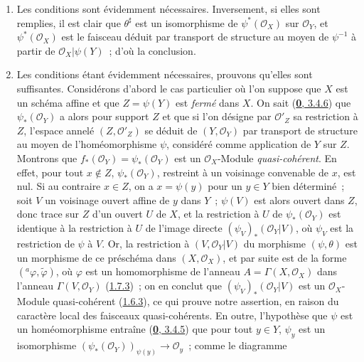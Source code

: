\begin{enumerate}
  \item[\emph{a)}] Les conditions sont évidemment nécessaires. Inversement, si elles
  sont remplies, il est clair que $\theta^\sharp$ est un isomorphisme de
  $\psi^*(\mathscr{O}_X)$ sur $\mathscr{O}_Y$, et
  $\psi^*(\mathscr{O}_X)$ est le faisceau déduit par transport de structure au
  moyen de $\psi^{-1}$ à partir de $\mathscr{O}_X|\psi(Y)$~; d'où la
  conclusion.
  \item[\emph{b)}] Les conditions étant évidemment nécessaires, prouvons qu'elles
  sont suffisantes. Considérons d'abord le cas particulier où l'on suppose que
  $X$ est un schéma affine et que $Z=\psi(Y)$ est \emph{fermé} dans $X$. On
  sait (\hyperref[0.3.4.6-fr]{\textbf{0}, 3.4.6}) que $\psi_*(\mathscr{O}_Y)$ a alors
  pour support $Z$ et que si l'on désigne par $\mathscr{O}'_Z$ sa restriction
  à $Z$, l'espace annelé $(Z,\mathscr{O}'_Z)$ se déduit de
  $(Y,\mathscr{O}_Y)$ par transport de structure au moyen de
  l'homéomorphisme $\psi$, considéré comme application de $Y$ sur $Z$.
  Montrons que $f_*(\mathscr{O}_Y)=\psi_*(\mathscr{O}_Y)$ est un
  $\mathscr{O}_X$-Module \emph{quasi-cohérent}. En effet, pour tout
  $x\notin Z$, $\psi_*(\mathscr{O}_Y)$, restreint à un voisinage convenable de
  $x$, est nul. Si au contraire $x\in Z$, on a $x=\psi(y)$ pour un $y\in Y$
  bien déterminé~; soit $V$ un voisinage ouvert affine de $y$ dans $Y$~;
  $\psi(V)$ est alors ouvert dans $Z$, donc trace sur $Z$ d'un ouvert $U$ de
  $X$, et la restriction à $U$ de $\psi_*(\mathscr{O}_Y)$ est identique à la
  restriction à $U$ de l'image
  directe $(\psi_V)_*(\mathscr{O}_Y|V)$, où $\psi_V$ est la restriction de
  $\psi$ à $V$. Or, la restriction à $(V,\mathscr{O}_Y|V)$ du morphisme
  $(\psi,\theta)$ est un morphisme de ce préschéma dans
  $(X,\mathscr{O}_X)$, et par suite est de la forme
  $({}^a\varphi,\widetilde{\varphi})$, où $\varphi$ est un homomorphisme de
  l'anneau $A=\Gamma(X,\mathscr{O}_X)$ dans l'anneau
  $\Gamma(V,\mathscr{O}_Y)$ (\hyperref[I.1.7.3-fr]{1.7.3})~; on en conclut
  que $(\psi_V)_*(\mathscr{O}_Y|V)$ est un $\mathscr{O}_X$-Module
  quasi-cohérent (\hyperref[I.1.6.3-fr]{1.6.3}), ce qui prouve notre
  assertion, en raison du caractère local des faisceaux quasi-cohérents. En
  outre, l'hypothèse que $\psi$ est un homéomorphisme entraîne
  (\hyperref[0.3.4.5-fr]{\textbf{0}, 3.4.5}) que pour tout $y\in Y$, $\psi_y$ est un
  isomorphisme
  $(\psi_*(\mathscr{O}_Y))_{\psi(y)}\to\mathscr{O}_y$~; comme le diagramme
  \label{I.4.2.2.theta-diagram-fr}

\end{enumerate}
